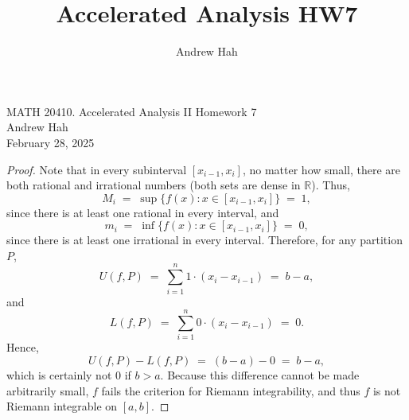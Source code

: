 \documentclass[11pt]{article}
\title{Accelerated Analysis HW7}
\author{Andrew Hah}
\begin{document}
\pagestyle{plain}
\begin{center}
{\Large MATH 20410. Accelerated Analysis II Homework 7} \\ 
\vspace{.2in}  
Andrew Hah \\
February 28, 2025
\end{center}

\begin{exercise}{6.4}
    \begin{proof} Note that in every subinterval $[x_{i-1}, x_i]$, no matter how small, there are both rational and irrational numbers (both sets are dense in $\mathbb{R}$). Thus,
\[
   M_i \;=\; \sup \{f(x)\colon x \in [x_{i-1}, x_i]\} \;=\; 1,
\]
since there is at least one rational in every interval,
and
\[
   m_i \;=\; \inf \{f(x)\colon x \in [x_{i-1}, x_i]\} \;=\; 0,
\]
since there is at least one irrational in every interval. Therefore, for any partition $P$,
\[
  U(f,P)
  \;=\; \sum_{i=1}^n 1\cdot (x_i - x_{i-1})
  \;=\; b - a,
\]
and
\[
  L(f,P)
  \;=\; \sum_{i=1}^n 0\cdot (x_i - x_{i-1})
  \;=\; 0.
\]
Hence,
\[
  U(f,P) - L(f,P) \;=\; (b - a) - 0
  \;=\; b-a,
\]
which is certainly not $0$ if $b>a$. Because
this difference cannot be made arbitrarily small, $f$ fails the criterion for Riemann integrability, and thus $f$ is not Riemann
integrable on $[a,b]$.
\end{proof}
\end{exercise}
\end{document}
